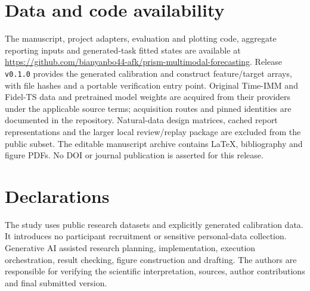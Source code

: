 \documentclass[preprint,11pt]{elsarticle}
\begin{document}


\section*{Data and code availability}

The manuscript, project adapters, evaluation and plotting code, aggregate reporting inputs and generated-task fitted states are available at \url{https://github.com/bianyanbo44-afk/prism-multimodal-forecasting}. Release \texttt{v0.1.0} provides the generated calibration and construct feature/target arrays, with file hashes and a portable verification entry point. Original Time-IMM and Fidel-TS data and pretrained model weights are acquired from their providers under the applicable source terms; acquisition routes and pinned identities are documented in the repository. Natural-data design matrices, cached report representations and the larger local review/replay package are excluded from the public subset. The editable manuscript archive contains LaTeX, bibliography and figure PDFs. No DOI or journal publication is asserted for this release.

\section*{Declarations}

The study uses public research datasets and explicitly generated calibration data. It introduces no participant recruitment or sensitive personal-data collection. Generative AI assisted research planning, implementation, execution orchestration, result checking, figure construction and drafting. The authors are responsible for verifying the scientific interpretation, sources, author contributions and final submitted version.



\clearpage
\appendix

\end{document}

